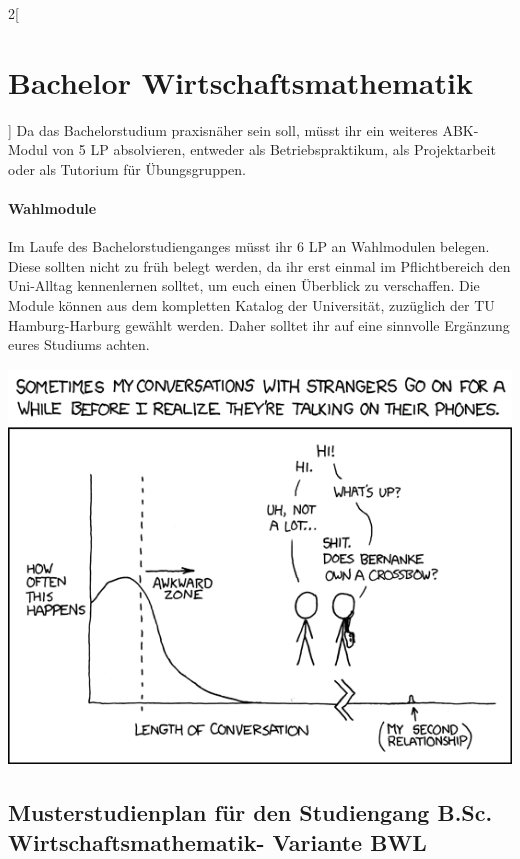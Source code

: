 \begin{multicols}{2}[\section{Bachelor Wirtschaftsmathematik}]
Da das Bachelorstudium praxisnäher sein soll, müsst ihr ein weiteres ABK-Modul
von 5 LP absolvieren, entweder als Betriebspraktikum, als Projektarbeit oder
als Tutorium für Übungsgruppen.

\paragraph{Wahlmodule}

Im Laufe des Bachelorstudienganges müsst ihr 6 LP an Wahlmodulen belegen. Diese
sollten nicht zu früh belegt werden, da ihr erst einmal im Pflichtbereich den
Uni-Alltag kennenlernen solltet, um euch einen Überblick zu verschaffen. Die
Module können aus dem kompletten Katalog der Universität, zuzüglich der TU
Hamburg-Harburg gewählt werden. Daher solltet ihr auf eine sinnvolle Ergänzung
eures Studiums achten. \vfill

\begin{center}
\vfill\includegraphics[scale=.55]{comics/476}
\end{center}

\end{multicols}

\clearpage

\subsection{Musterstudienplan für den Studiengang B.Sc.  Wirtschaftsmathematik-
Variante BWL}

